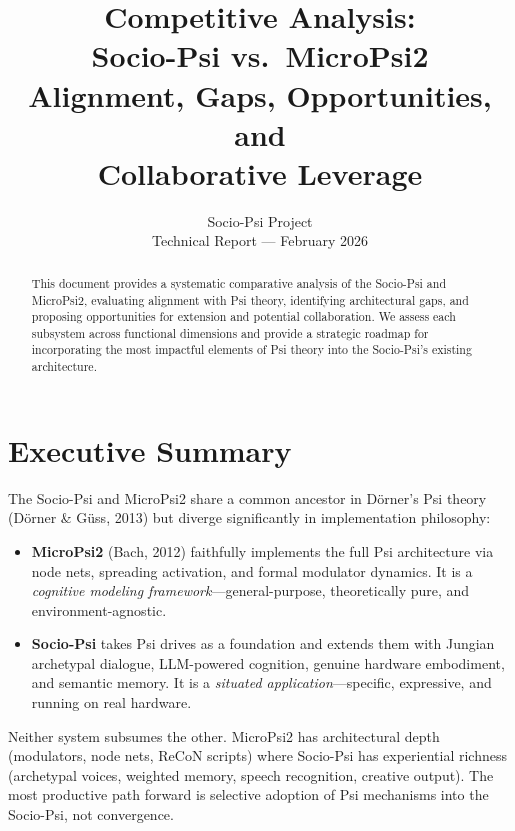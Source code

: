\documentclass[11pt,letterpaper]{article}
\title{%
  \sffamily\bfseries
  \textcolor{jungblue}{Competitive Analysis:\\[0.3em]
  Socio-Psi vs.\ MicroPsi2}\\[0.8em]
  \large\textcolor{jungmuted}{Alignment, Gaps, Opportunities, and\\
  Collaborative Leverage}
}
\author{%
  \sffamily Socio-Psi Project\\[0.3em]
  \small\textcolor{jungmuted}{Technical Report --- February 2026}
}
\date{}
\begin{document}
\maketitle
\thispagestyle{fancy}

\begin{abstract}
\noindent
This document provides a systematic comparative analysis of the Socio-Psi
and MicroPsi2, evaluating alignment with Psi theory, identifying
architectural gaps, and proposing opportunities for extension and potential
collaboration. We assess each subsystem across functional dimensions and
provide a strategic roadmap for incorporating the most impactful elements of
Psi theory into the Socio-Psi's existing architecture.
\end{abstract}

\vspace{1em}
\tableofcontents
\newpage

\section{Executive Summary}

The Socio-Psi and MicroPsi2 share a common ancestor in D\"orner's Psi
theory (D\"orner \& G\"uss, 2013) but diverge significantly in
implementation philosophy:

\begin{itemize}
  \item \textbf{MicroPsi2} (Bach, 2012) faithfully implements the full Psi
    architecture via node nets, spreading activation, and formal modulator
    dynamics. It is a \emph{cognitive modeling framework}---general-purpose,
    theoretically pure, and environment-agnostic.
  \item \textbf{Socio-Psi} takes Psi drives as a foundation and extends
    them with Jungian archetypal dialogue, LLM-powered cognition, genuine
    hardware embodiment, and semantic memory. It is a \emph{situated
    application}---specific, expressive, and running on real hardware.
\end{itemize}

Neither system subsumes the other. MicroPsi2 has architectural depth
(modulators, node nets, ReCoN scripts) where Socio-Psi has experiential
richness (archetypal voices, weighted memory, speech recognition, creative
output). The most productive path forward is selective adoption of Psi
mechanisms into the Socio-Psi, not convergence.
\end{document}
